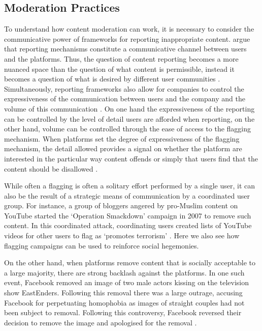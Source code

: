 \subsection{Moderation Practices}
To understand how content moderation can work, it is necessary to consider the communicative power of frameworks for reporting inappropriate content.
\citet{Crawford:2016} argue that reporting mechanisms constitute a communicative channel between users and the platforms.
Thus, the question of content reporting becomes a more nuanced space than the question of what content is permissible, instead it becomes a question of what is desired by different user communities \citep{Crawford:2016}.
Simultaneously, reporting frameworks also allow for companies to control the expressiveness of the communication between users and the company and the volume of this communication \citep{Crawford:2016}.
On one hand the expressiveness of the reporting can be controlled by the level of detail users are afforded when reporting, on the other hand, volume can be controlled through the ease of access to the flagging mechanism.
When platforms set the degree of expressiveness of the flagging mechanism, the detail allowed provides a signal on whether the platform are interested in the particular way content offends or simply that users find that the content should be disallowed \citep{Crawford:2016}.

While often a flagging is often a solitary effort performed by a single user, it can also be the result of a strategic means of communication by a coordinated user group.
For instance, a group of bloggers angered by pro-Muslim content on YouTube started the `Operation Smackdown' campaign in 2007 to remove such content.
In this coordinated attack, coordinating users created lists of YouTube videos for other users to flag as `promotes terrorism' \citep{Crawford:2016}.
Here we also see how flagging campaigns can be used to reinforce social hegemonies.

On the other hand, when platforms remove content that is socially acceptable to a large majority, there are strong backlash against the platforms.
In one such event, Facebook removed an image of two male actors kissing on the television show EastEnders.
Following this removal there was a large outrage, accusing Facebook for perpetuating homophobia as images of straight couples had not been subject to removal.
Following this controversy, Facebook reversed their decision to remove the image and apologised for the removal \citep{Crawford:2016}.

